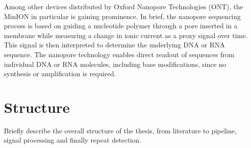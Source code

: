 Among other devices distributed by Oxford Nanopore Technologies (ONT), the MinION in particular is gaining prominence. In brief, the nanopore sequencing process is based on guiding a nucleotide polymer through a pore inserted in a membrane while measuring a change in ionic current as a proxy signal over time. This signal is then interpreted to determine the underlying DNA or RNA sequence. The nanopore technology enables direct readout of sequences from individual DNA or RNA molecules, including base modifications, since no synthesis or amplification is required.




\section{Structure}
\label{sec:intro:structure}

Briefly describe the overall structure of the thesis, from literature to pipeline, signal processing and finally repeat detection.


